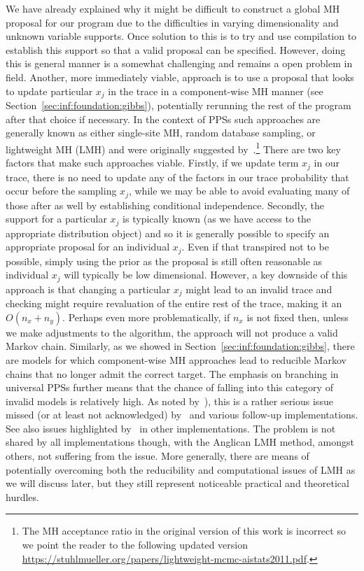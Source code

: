 We have already explained why it might be difficult to construct a global MH proposal for
our program due to the difficulties in varying dimensionality and unknown variable supports.
Once solution to this is to try and use compilation to establish this support so that
a valid proposal can be specified.  However, doing this is general manner is a somewhat
challenging and remains a open problem in field.  Another, more immediately viable,
approach is to use a proposal that looks to update particular $x_j$ in the trace in a
component-wise MH manner (see Section~\ref{sec:inf:foundation:gibbs}), potentially rerunning
the rest of the program after that choice if necessary.  In the context of PPSs such
approaches are generally known as either single-site MH, random database sampling, or lightweight MH (LMH) and were
originally suggested by~\citep{wingate2011lightweight}.\footnote{The MH acceptance ratio in the original version of this work
	is incorrect so we point the reader to the following updated version
	\url{https://stuhlmueller.org/papers/lightweight-mcmc-aistats2011.pdf}.} There are two key factors
that make such approaches viable.  Firstly, if we update term $x_j$ in our trace, there is
no need to update any of the factors in our trace probability that occur before the sampling
$x_j$, while we may be able to avoid evaluating many of those after as well by establishing
conditional independence.  Secondly, the support for a particular $x_j$ is typically known (as 
we have access to the appropriate distribution object) and so it is generally possible to specify
an appropriate proposal for an individual $x_j$.  Even if that transpired not to be possible, 
simply using the prior as the proposal is still often reasonable as individual $x_j$ will typically
be low dimensional.  However, a key downside of this approach is that changing a particular $x_j$
might lead to an invalid trace and checking might require revaluation of the entire rest of the
trace, making it an $O(n_x+n_y)$.  Perhaps even more problematically, if $n_x$ is not fixed
then, unless we make adjustments to the algorithm, the approach will not produce a 
valid Markov chain.  Similarly, as we showed in Section~\ref{sec:inf:foundation:gibbs},
there are models for which component-wise MH approaches lead to reducible Markov chains
that no longer admit the correct target.  The emphasis on branching in universal PPSs further
means that the chance of falling into this category of invalid models is relatively high.  As
noted by~\citep{kiselyov2016problems}), this is a rather serious issue missed (or at least not
acknowledged) by~\cite{wingate2011lightweight} and various follow-up implementations.
See also issues highlighted by~\citep{hur2015provably} in other implementations.
The problem is not shared by all implementations though, with the Anglican LMH method, amongst
others, not suffering from the issue.
More generally, there are means of potentially overcoming both the reducibility and computational
issues of LMH as we will discuss later, but
they still represent noticeable practical and theoretical hurdles.

